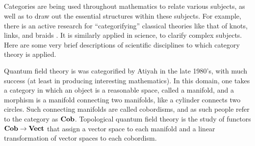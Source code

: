 \documentclass[CT4S-EN-RU]{subfiles}
\begin{document}
\begin{blockRUS}
\end{blockRUS}


\subsection{} 

\begin{blockENG}
Categories are being used throughout mathematics to relate various subjects, as well as to draw out the essential structures within these subjects. For example, there is an active research for “categorifying” classical theories like that of knots, links, and braids \cite{Kho}. It is similarly applied in science, to clarify complex subjects. Here are some very brief descriptions of scientific disciplines to which category theory is applied.
\end{blockENG}

\begin{blockRUS}
\end{blockRUS}

\begin{blockENG}
Quantum field theory is was categorified by Atiyah \cite{Ati} in the late 1980's, with much success (at least in producing interesting mathematics). In this domain, one takes a category in which an object is a reasonable space, called a manifold, and a morphism is a manifold connecting two manifolds, like a cylinder connects two circles. Such connecting manifolds are called cobordisms, and as such people refer to the category as ${\bf Cob}$. Topological quantum field theory is the study of functors ${\bf Cob}\rightarrow{\bf Vect}$ that assign a vector space to each manifold and a linear transformation of vector spaces to each cobordism. 
\end{blockENG}

\begin{blockRUS}
\end{blockRUS}
\end{document}
